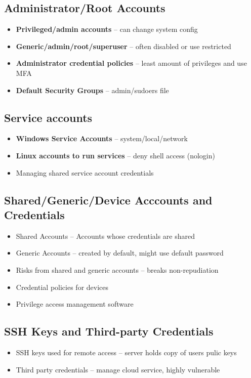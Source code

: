 	\subsection {Administrator/Root Accounts}
		\begin{itemize}
			\item \textbf{Privileged/admin accounts} -- can change system config
			\item \textbf{Generic/admin/root/superuser} -- often disabled or use restricted
			\item \textbf{Administrator credential policies} -- least amount of privileges
				and use MFA
			\item \textbf{Default Security Groups} -- admin/sudoers file
		\end{itemize}
	\subsection {Service accounts}
		\begin{itemize}
			\item \textbf{Windows Service Accounts} -- system/local/network
			\item \textbf{Linux accounts to run services} -- deny shell access (nologin)
			\item Managing shared service account credentials
		\end{itemize}
	\subsection {Shared/Generic/Device Acccounts and Credentials}
		\begin{itemize}
			\item Shared Accounts -- Accounts whose credentials are shared
			\item Generic Accounts -- created by default, might use default password
			\item Risks from shared and generic accounts -- breaks non-repudiation
			\item Credential policies for devices
			\item Privilege access management software
		\end{itemize}
	\subsection {SSH Keys and Third-party Credentials}
		\begin{itemize}
			\item SSH keys used for remote access -- server holds copy of users pulic keys
			\item Third party credentials -- manage cloud service, highly vulnerable
		\end{itemize}

